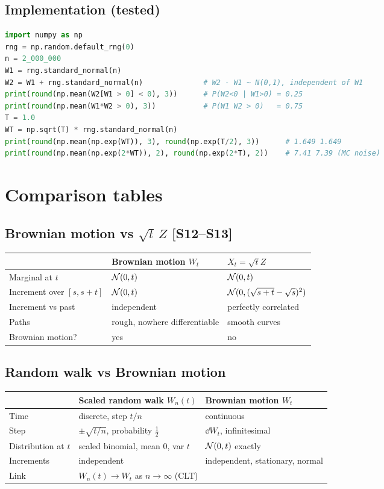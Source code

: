 \documentclass[10pt]{article}
\begin{document}
\subsection{Implementation \beyond{} (tested)}
\begin{lstlisting}[language=Python]
import numpy as np
rng = np.random.default_rng(0)
n = 2_000_000
W1 = rng.standard_normal(n)
W2 = W1 + rng.standard_normal(n)              # W2 - W1 ~ N(0,1), independent of W1
print(round(np.mean(W2[W1 > 0] < 0), 3))      # P(W2<0 | W1>0) = 0.25
print(round(np.mean(W1*W2 > 0), 3))           # P(W1 W2 > 0)   = 0.75
T = 1.0
WT = np.sqrt(T) * rng.standard_normal(n)
print(round(np.mean(np.exp(WT)), 3), round(np.exp(T/2), 3))      # 1.649 1.649
print(round(np.mean(np.exp(2*WT)), 2), round(np.exp(2*T), 2))    # 7.41 7.39 (MC noise)
\end{lstlisting}

\section{Comparison tables}
\subsection{Brownian motion vs $\sqrt t\,Z$ [S12--S13]}
{\small\begin{tabularx}{\linewidth}{@{}l X X@{}}\toprule
 & Brownian motion $W_t$ & $X_t=\sqrt tZ$\\\midrule
Marginal at $t$ & $\mathcal{N}(0,t)$ & $\mathcal{N}(0,t)$\\
Increment over $[s,s+t]$ & $\mathcal{N}(0,t)$ & $\mathcal{N}(0,(\sqrt{s+t}-\sqrt s)^2)$\\
Increment vs past & independent & perfectly correlated\\
Paths & rough, nowhere differentiable & smooth curves\\
Brownian motion? & yes & no\\\bottomrule
\end{tabularx}}
\subsection{Random walk vs Brownian motion}
{\small\begin{tabularx}{\linewidth}{@{}l X X@{}}\toprule
 & Scaled random walk $W_n(t)$ & Brownian motion $W_t$\\\midrule
Time & discrete, step $t/n$ & continuous\\
Step & $\pm\sqrt{t/n}$, probability $\frac12$ & $\dd W_t$, infinitesimal\\
Distribution at $t$ & scaled binomial, mean 0, var $t$ & $\mathcal{N}(0,t)$ exactly\\
Increments & independent & independent, stationary, normal\\
Link & \multicolumn{2}{l}{$W_n(t)\to W_t$ as $n\to\infty$ (CLT)}\\\bottomrule
\end{tabularx}}
\end{document}
